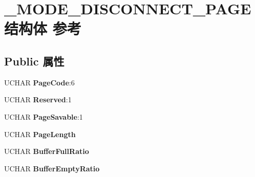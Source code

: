\hypertarget{struct___m_o_d_e___d_i_s_c_o_n_n_e_c_t___p_a_g_e}{}\section{\+\_\+\+M\+O\+D\+E\+\_\+\+D\+I\+S\+C\+O\+N\+N\+E\+C\+T\+\_\+\+P\+A\+G\+E结构体 参考}
\label{struct___m_o_d_e___d_i_s_c_o_n_n_e_c_t___p_a_g_e}
\subsection*{Public 属性}
\begin{DoxyCompactItemize}
\item 
\mbox{\label{struct___m_o_d_e___d_i_s_c_o_n_n_e_c_t___p_a_g_e_a15a43cb8670ec734b7dfef1be01b62f7}} 
U\+C\+H\+AR {\bfseries Page\+Code}\+:6
\item 
\mbox{\label{struct___m_o_d_e___d_i_s_c_o_n_n_e_c_t___p_a_g_e_ae37777ad84b9c56f388a3aa07853853d}} 
U\+C\+H\+AR {\bfseries Reserved}\+:1
\item 
\mbox{\label{struct___m_o_d_e___d_i_s_c_o_n_n_e_c_t___p_a_g_e_ad4578f559099d535ac9ee7b97be66ff7}} 
U\+C\+H\+AR {\bfseries Page\+Savable}\+:1
\item 
\mbox{\label{struct___m_o_d_e___d_i_s_c_o_n_n_e_c_t___p_a_g_e_aa0d75bc70b2ab54361f379fa8eba66f9}} 
U\+C\+H\+AR {\bfseries Page\+Length}
\item 
\mbox{\label{struct___m_o_d_e___d_i_s_c_o_n_n_e_c_t___p_a_g_e_ad27b9abfdf3d3d8f58da37b11c90b6d9}} 
U\+C\+H\+AR {\bfseries Buffer\+Full\+Ratio}
\item 
\mbox{\label{struct___m_o_d_e___d_i_s_c_o_n_n_e_c_t___p_a_g_e_a31460049c699700368383cdfc69d148d}} 
U\+C\+H\+AR {\bfseries Buffer\+Empty\+Ratio}
\item 
\mbox{\label{struct___m_o_d_e___d_i_s_c_o_n_n_e_c_t___p_a_g_e_aa2346eb171eca5a58a13fcca5053d268}} 

\end{DoxyCompactItemize}
